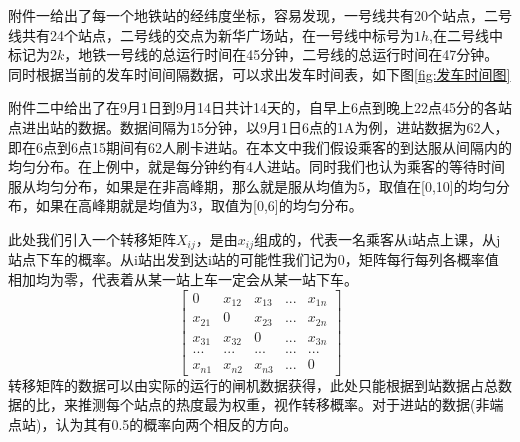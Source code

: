 \documentclass[12pt,a4paper]{mcmthesis}
\begin{document}
    附件一给出了每一个地铁站的经纬度坐标，容易发现，一号线共有20个站点，二号线共有24个站点，二号线的交点为新华广场站，在一号线中标号为$1h$,在二号线中标记为$2k$，地铁一号线的总运行时间在45分钟，二号线的总运行时间在47分钟。同时根据当前的发车时间间隔数据，可以求出发车时间表，如下图\ref{fig:发车时间图}

    附件二中给出了在9月1日到9月14日共计14天的，自早上6点到晚上22点45分的各站点进出站的数据。数据间隔为15分钟，以9月1日6点的1A为例，进站数据为62人，即在6点到6点15期间有62人刷卡进站。在本文中我们假设乘客的到达服从间隔内的均匀分布。在上例中，就是每分钟约有4人进站。同时我们也认为乘客的等待时间服从均匀分布，如果是在非高峰期，那么就是服从均值为5，取值在[0,10]的均匀分布，如果在高峰期就是均值为3，取值为[0,6]的均匀分布。

    此处我们引入一个转移矩阵$X_{ij}$，是由$x_{ij}$组成的，代表一名乘客从i站点上课，从j站点下车的概率。从i站出发到达i站的可能性我们记为0，矩阵每行每列各概率值相加均为零，代表着从某一站上车一定会从某一站下车。
    \begin{equation}
        \begin{bmatrix}
            0 &x_{12}  &x_{13} &... & x_{1n}\\
            x_{21} &0  &x_{23} & ... &x_{2n} \\
            x_{31} & x_{32} &0 & ...&x_{3n} \\
            ...&  ... &   ...&  ... &...\\
            x_{n1} & x_{n2} &x_{n3} &... &0
        \end{bmatrix}
    \end{equation}
    转移矩阵的数据可以由实际的运行的闸机数据获得，此处只能根据到站数据占总数据的比，来推测每个站点的热度最为权重，视作转移概率。对于进站的数据(非端点站)，认为其有0.5的概率向两个相反的方向。
\end{document}
